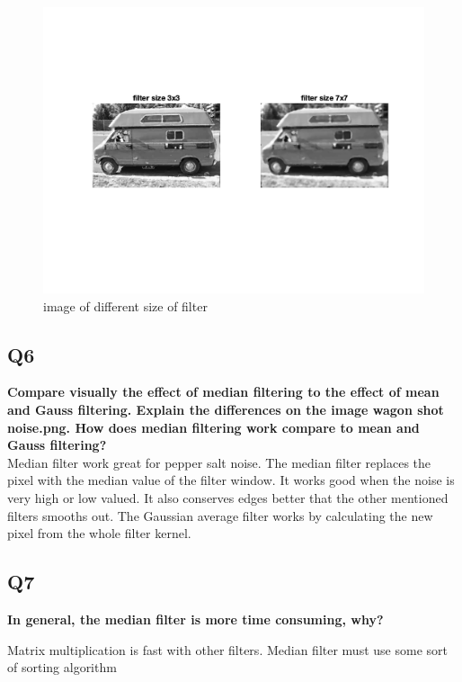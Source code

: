 \documentclass[oneside,a4paper]{article}
\begin{document}
\begin{figure}[ht!]
\centering
\includegraphics[width=130mm]{figures/Q5.png}
\caption{image of different size of filter}
\label{fig:Q5}
\end{figure}

\subsection*{Q6}
\noindent \textbf{Compare visually the effect of median filtering to the effect of mean and Gauss filtering. Explain the differences on the image wagon shot noise.png. How does median filtering work compare to mean and Gauss filtering?} \\

Median filter work great for pepper salt noise. The median filter replaces the pixel with the median value of the filter window. It works good when the noise is very high or low valued. It also conserves edges better that the other mentioned filters smooths out. The Gaussian average filter works by calculating the new pixel from the whole filter kernel.


\subsection*{Q7}
\noindent \textbf{In general, the median filter is more time consuming, why?}

Matrix multiplication is fast with other filters. Median filter must use some sort of sorting algorithm 
\end{document}
